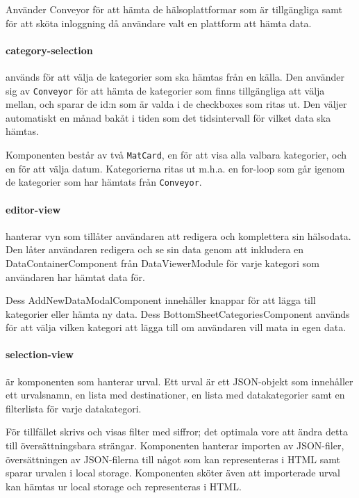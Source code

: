 \documentclass[techdoc/techdock.tex]{subfiles}
\begin{document}
Använder Conveyor för att hämta de hälsoplattformar som är tillgängliga samt
för att sköta inloggning då användare valt en plattform att hämta data.

\paragraph{category-selection} används för att välja de kategorier som ska
hämtas från en källa. Den använder sig av \texttt{Conveyor} för att hämta de
kategorier som finns tillgängliga att välja mellan, och sparar de id:n som är
valda i de checkboxes som ritas ut. Den väljer automatiskt en månad bakåt i
tiden som det tidsintervall för vilket data ska hämtas.

Komponenten består av två \texttt{MatCard}, en för att visa alla
valbara kategorier, och en för att välja datum. Kategorierna ritas ut m.h.a.
en for-loop som går igenom de kategorier som har hämtats från \texttt{Conveyor}.

\paragraph{editor-view}
hanterar vyn som tillåter användaren att redigera och komplettera sin
hälsodata. Den låter användaren redigera och se sin data genom att inkludera en
DataContainerComponent från DataViewerModule för varje kategori som användaren
har hämtat data för.

Dess AddNewDataModalComponent innehåller knappar för att lägga till kategorier
eller hämta ny data. Dess BottomSheetCategoriesComponent används för att välja
vilken kategori att lägga till om användaren vill mata in egen data.

\paragraph{selection-view}
är komponenten som hanterar urval. Ett urval är ett JSON-objekt som innehåller 
ett urvalsnamn, en lista med destinationer, en lista med datakategorier samt en 
filterlista för varje datakategori. 

För tillfället skrivs och visas filter med siffror; det optimala vore att ändra 
detta till översättningsbara strängar. Komponenten hanterar importen av 
JSON-filer, översättningen av JSON-filerna till något som kan representeras i 
HTML samt sparar urvalen i local storage. Komponenten sköter även att importerade 
urval kan hämtas ur local storage och representeras i HTML. 
\end{document}
